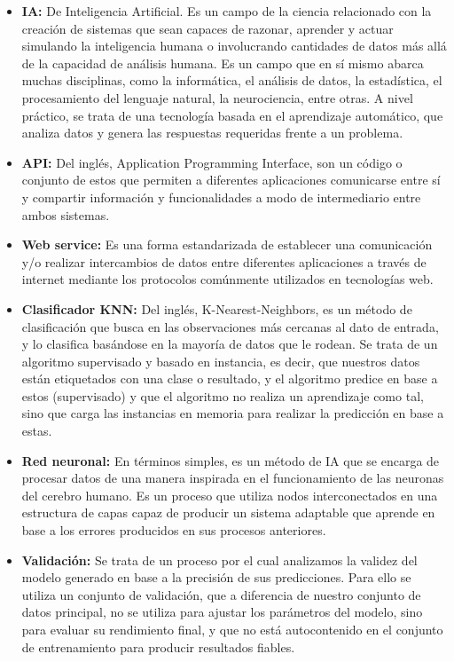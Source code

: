 \documentclass{article}
\begin{document}
\begin{itemize}
	\item \textbf{IA:} De Inteligencia Artificial. Es un campo de la ciencia relacionado con la creación de sistemas que sean capaces de razonar, aprender y actuar simulando la inteligencia humana o involucrando cantidades de datos más allá de la capacidad de análisis humana. Es un campo que en sí mismo abarca muchas disciplinas, como la informática, el análisis de datos, la estadística, el procesamiento del lenguaje natural, la neurociencia, entre otras. A nivel práctico, se trata de una tecnología basada en el aprendizaje automático, que analiza datos y genera las respuestas requeridas frente a un problema.
	\item \textbf{API:} Del inglés, Application Programming Interface, son un código o conjunto de estos que permiten a diferentes aplicaciones comunicarse entre sí y compartir información y funcionalidades a modo de intermediario entre ambos sistemas.
	\item \textbf{Web service:} Es una forma estandarizada de establecer una comunicación y/o realizar intercambios de datos entre diferentes aplicaciones a través de internet mediante los protocolos comúnmente utilizados en tecnologías web.
	\item \textbf{Clasificador KNN:} Del inglés, K-Nearest-Neighbors, es un método de clasificación que busca en las observaciones más cercanas al dato de entrada, y lo clasifica basándose en la mayoría de datos que le rodean. Se trata de un algoritmo supervisado y basado en instancia, es decir, que nuestros datos están etiquetados con una clase o resultado, y el algoritmo predice en base a estos (supervisado) y que el algoritmo no realiza un aprendizaje como tal, sino que carga las instancias en memoria para realizar la predicción en base a estas.
	\item \textbf{Red neuronal:} En términos simples, es un método de IA que se encarga de procesar datos de una manera inspirada en el funcionamiento de las neuronas del cerebro humano. Es un proceso que utiliza nodos interconectados en una estructura de capas capaz de producir un sistema adaptable que aprende en base a los errores producidos en sus procesos anteriores.
	\item \textbf{Validación:} Se trata de un proceso por el cual analizamos la validez del modelo generado en base a la precisión de sus predicciones. Para ello se utiliza un conjunto de validación, que a diferencia de nuestro conjunto de datos principal, no se utiliza para ajustar los parámetros del modelo, sino para evaluar su rendimiento final, y que no está autocontenido en el conjunto de entrenamiento para producir resultados fiables.

\end{itemize}
\end{document}

